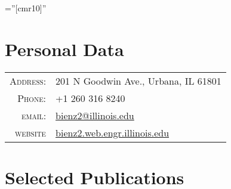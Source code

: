 \documentclass[a4paper,10pt]{article} %
\begin{document}
\pagestyle{empty} %

\font\fb=''[cmr10]'' %


\par{\bigskip\par} %

\section{Personal Data}

\begin{tabular}{rl}
\textsc{Address:} & 201 N Goodwin Ave., Urbana, IL 61801 \\
\textsc{Phone:} & +1 260 316 8240\\
\textsc{email:} & \href{mailto:bienz2@illinois.edu}{bienz2@illinois.edu}\\
\textsc{website} & \href{http://bienz2.web.engr.illinois.edu/}{bienz2.web.engr.illinois.edu}
\end{tabular}


\section{Selected Publications}
\end{document}
